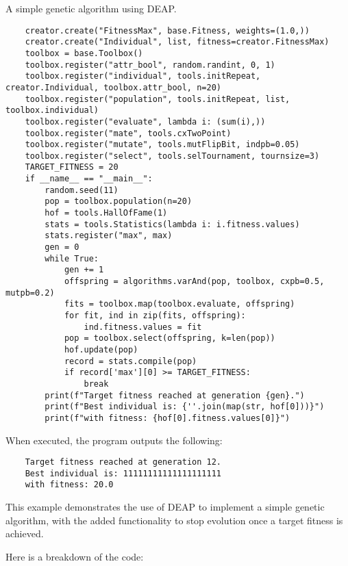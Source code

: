   \begin{listing}[H]
    \caption{A simple genetic algorithm using DEAP.}
    \label{src:sota:deap:example}
  \end{listing}
  \vspace{-2em}
  \begin{verbatim}
    creator.create("FitnessMax", base.Fitness, weights=(1.0,))
    creator.create("Individual", list, fitness=creator.FitnessMax)
    toolbox = base.Toolbox()
    toolbox.register("attr_bool", random.randint, 0, 1)
    toolbox.register("individual", tools.initRepeat, creator.Individual, toolbox.attr_bool, n=20)
    toolbox.register("population", tools.initRepeat, list, toolbox.individual)
    toolbox.register("evaluate", lambda i: (sum(i),))
    toolbox.register("mate", tools.cxTwoPoint)
    toolbox.register("mutate", tools.mutFlipBit, indpb=0.05)
    toolbox.register("select", tools.selTournament, tournsize=3)
    TARGET_FITNESS = 20
    if __name__ == "__main__":
        random.seed(11)
        pop = toolbox.population(n=20)
        hof = tools.HallOfFame(1)
        stats = tools.Statistics(lambda i: i.fitness.values)
        stats.register("max", max)
        gen = 0
        while True:
            gen += 1
            offspring = algorithms.varAnd(pop, toolbox, cxpb=0.5, mutpb=0.2)
            fits = toolbox.map(toolbox.evaluate, offspring)
            for fit, ind in zip(fits, offspring):
                ind.fitness.values = fit
            pop = toolbox.select(offspring, k=len(pop))
            hof.update(pop)
            record = stats.compile(pop)
            if record['max'][0] >= TARGET_FITNESS:
                break
        print(f"Target fitness reached at generation {gen}.")
        print(f"Best individual is: {''.join(map(str, hof[0]))}")
        print(f"with fitness: {hof[0].fitness.values[0]}")
  \end{verbatim}

  When executed, the program outputs the following:

  \begin{verbatim}
    Target fitness reached at generation 12.
    Best individual is: 11111111111111111111
    with fitness: 20.0
  \end{verbatim}

  This example demonstrates the use of DEAP to implement a simple genetic
  algorithm, with the added functionality to stop evolution once a target
  fitness is achieved.

  Here is a breakdown of the code:

